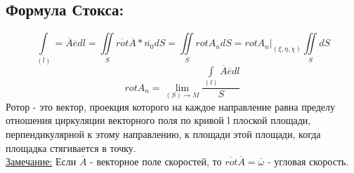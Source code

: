 \documentclass[12pt]{article}
\let\oldint\int
\let\oldiint\iint
\let\oldlim\lim
\renewcommand{\int}{\oldint\limits}
\renewcommand{\iint}{\oldiint\limits}
\renewcommand{\lim}{\oldlim\limits}
\begin{document}
  \subsection*{Формула Стокса:}
  \[\int_{(l)} = \overline{A}\overline{e}dl 
  = \iint_S \overline{rot}\overline{A}*\overline{n_0} dS 
  = \iint_S rot A_n dS
  = rot A_n \Big|_{(\xi,\eta,\chi)} \iint_S dS\]
  \[rot A_n = \lim_{(S) \to M} \frac{\int_{(l)} \overline{A}\overline{e}dl}{S}\]
  Ротор - это вектор, проекция которого на каждое направление равна пределу отношения циркуляции векторного
  поля по кривой l плоской площади, перпендикулярной к этому направлению, к площади этой площади, 
  когда площадка стягивается в точку.\\
  \underline{Замечание:} Если $\overline{A}$ - векторное поле скоростей, то 
  $\overline{rot}\overline{A} = \overline{\omega}$ - угловая скорость.
\end{document}
